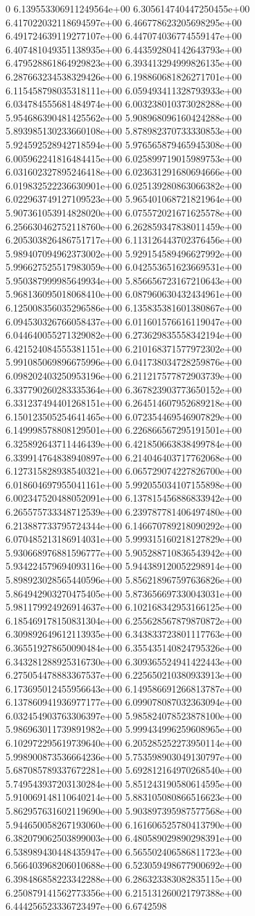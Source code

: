 0	6.139553306911249564e+00	6.305614740447250455e+00	6.417022032118694597e+00	6.466778623205698295e+00	6.491724639119277107e+00	6.447074036774559147e+00	6.407481049351138935e+00	6.443592804142643793e+00	6.479528861864929823e+00	6.393413294999826135e+00	6.287663234538329426e+00	6.198860681826271701e+00	6.115458798035318111e+00	6.059493411328793933e+00	6.034784555681484974e+00	6.003238010373028288e+00	5.954686390481425562e+00	5.908968096160424288e+00	5.893985130233660108e+00	5.878982370733330853e+00	5.924592528942718594e+00	5.976565879465945308e+00	6.005962241816484415e+00	6.025899719015989753e+00	6.031602327895246418e+00	6.023631291680694666e+00	6.019832522236630901e+00	6.025139280863066382e+00	6.022963749127109523e+00	5.965401068721821964e+00	5.907361053914828020e+00	6.075572021671625578e+00	6.256630462752118760e+00	6.262859347838011459e+00	6.205303826486751717e+00	6.113126443702376456e+00	5.989407094962373002e+00	5.929154589496627992e+00	5.996627525517983059e+00	6.042553651623669531e+00	5.950387999985649934e+00	5.856656723167210643e+00	5.968136095018068410e+00	6.087960630432434961e+00	6.125008356035296586e+00	6.135835381601380867e+00	6.094530326766058437e+00	6.011601576616119047e+00	6.044640055271329082e+00	6.273629835558342194e+00	6.421524084555381151e+00	6.210168371577972302e+00	5.991085069896675996e+00	6.041738034728259876e+00	6.098202403250953196e+00	6.211217577872903739e+00	6.337790260283335364e+00	6.367823903773650152e+00	6.331237494401268151e+00	6.264514607952689218e+00	6.150123505254641465e+00	6.072354469546907829e+00	6.149998578808129501e+00	6.226866567295191501e+00	6.325892643711446439e+00	6.421850663838499784e+00	6.339914764838940897e+00	6.214046403717762068e+00	6.127315828938540321e+00	6.065729074227826700e+00	6.018604697955041161e+00	5.992055034107155898e+00	6.002347520488052091e+00	6.137815456886833942e+00	6.265575733348712539e+00	6.239787781406497480e+00	6.213887733795724344e+00	6.146670789218090292e+00	6.070485213186914031e+00	5.999315160218127829e+00	5.930668976881596777e+00	5.905288710836543942e+00	5.934224579694093116e+00	5.944389120052298914e+00	5.898923028565440596e+00	5.856218967597636826e+00	5.864942903270475405e+00	5.873656697330043031e+00	5.981179924926914637e+00	6.102168342953166125e+00	6.185469178150831304e+00	6.255628567879870872e+00	6.309892649612113935e+00	6.343833723801117763e+00	6.365519278650090484e+00	6.355435140824795326e+00	6.343281288925316730e+00	6.309365524941422443e+00	6.275054478883367537e+00	6.225650210380933913e+00	6.173695012455956643e+00	6.149586691266813787e+00	6.137860941936977177e+00	6.099078087032363094e+00	6.032454903763306397e+00	5.985824078523878100e+00	5.986963011739891982e+00	5.999434996259608965e+00	6.102972295619739640e+00	6.205285252273950114e+00	5.998900873536664236e+00	5.753598903049130797e+00	5.687085789337672281e+00	5.692812164970268540e+00	5.749543937203130284e+00	5.851243190580614595e+00	5.910069148110640214e+00	5.883105080866516623e+00	5.862957631602119690e+00	5.903897395987577568e+00	5.944650058267193060e+00	6.161606525780413790e+00	6.382079062503899003e+00	6.480589029890298391e+00	6.538989430448435947e+00	6.565502406586811723e+00	6.566403968206010688e+00	6.523059498677900692e+00	6.398486858223342288e+00	6.286323383082835115e+00	6.250879141562773356e+00	6.215131260021797388e+00	6.444256523336723497e+00	6.6742598